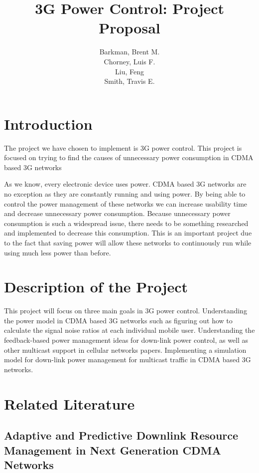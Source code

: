 \documentclass{article}
\title{3G Power Control: Project Proposal}
\author{Barkman, Brent M.\\ Chorney, Luis F.\\ Liu, Feng\\ Smith, Travis E.}
\begin{document}


\maketitle

\section{Introduction}

The project we have chosen to implement is 3G power control. This
project is focused on trying to find the causes of unnecessary power
consumption in CDMA based 3G networks

As we know, every electronic device uses power. CDMA based 3G networks
are no exception as they are constantly running and using power. By
being able to control the power management of these networks we can
increase usability time and decrease unnecessary power consumption.
Because unnecessary power consumption is such a widespread issue,
there needs to be something researched and implemented to decrease
this consumption. This is an important project due to the fact that
saving power will allow these networks to continuously run while
using much less power than before.

\section{Description of the Project}

This project will focus on three main goals in 3G power control.
Understanding the power model in CDMA based 3G networks such as
figuring out how to calculate the signal noise ratios at each
individual mobile user. Understanding the feedback-based power
management ideas for down-link power control, as well as other
multicast support in cellular networks papers. Implementing a
simulation model for down-link power management for multicast traffic
in CDMA based 3G networks.

\section{Related Literature}

\subsection{Adaptive and Predictive Downlink Resource Management in
  Next Generation CDMA Networks}
\end{document}
